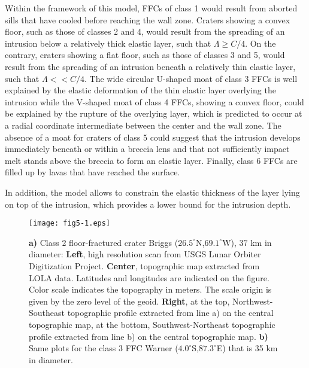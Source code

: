 \begin{article}
Within the framework of this model,  FFCs of class 1 would result from
aborted sills that have cooled  before reaching the wall zone. Craters
showing a convex floor, such as those of classes 2 and 4, would result
from the  spreading of an  intrusion below a relatively  thick elastic
layer, such that $\Lambda \ge C/4$. On the contrary, craters showing a
flat floor, such  as those of classes  3 and 5, would  result from the
spreading of  an intrusion  beneath a  relatively thin  elastic layer,
such that $\Lambda <<C/4$. The wide  circular U-shaped moat of class 3
FFCs is well explained by the  elastic deformation of the thin elastic
layer overlying the intrusion while the V-shaped moat of class 4 FFCs,
showing  a convex  floor, could  be explained  by the  rupture of  the
overlying layer,  which is predicted  to occur at a  radial coordinate
intermediate between  the center and the  wall zone. The absence  of a
moat for craters of class 5  could suggest that the intrusion develops
immediately beneath or within a breccia lens and that not sufficiently
impact   melt  stands   above   the  breccia   to   form  an   elastic
layer. Finally, class 6 FFCs are  filled up by lavas that have reached
the surface.
	
In addition,  the model allows  to constrain the elastic  thickness of
the layer lying on top of  the intrusion, which provides a lower bound
for the intrusion depth.
		
		
\begin{figure}[pb]
\graphicspath{{/Users/thorey/Documents/These/Submission/Article/FFC_JGR_2013/Paper_APRES_2nd_REVIEW/}}
  \begin{center}
    \texttt{[image: fig5-1.eps]}
    \caption{\textbf{a)}   Class  2   floor-fractured  crater   Briggs
      ($26.5^{\circ}$N,$69.1^{\circ}$W),   $37$    km   in   diameter:
      \textbf{Left},  high resolution  scan  from  USGS Lunar  Orbiter
      Digitization Project. \textbf{Center}, topographic map extracted
      from LOLA  data. Latitudes and  longitudes are indicated  on the
      figure.  Color scale  indicates  the topography  in meters.  The
      scale   origin   is   given   by   the   zero   level   of   the
      geoid.   \textbf{Right},   at   the   top,   Northwest-Southeast
      topographic  profile  extracted  from  line a)  on  the  central
      topographic map, at  the bottom, Southwest-Northeast topographic
      profile  extracted  from  line  b) on  the  central  topographic
      map.  \textbf{b)}  Same  plots  for   the  class  3  FFC  Warner
      ($4.0^{\circ}$S,$87.3^{\circ}$E) that is 35 km in diameter.}
    \label{fig5-1}
  \end{center}
\end{figure}



\end{article}
